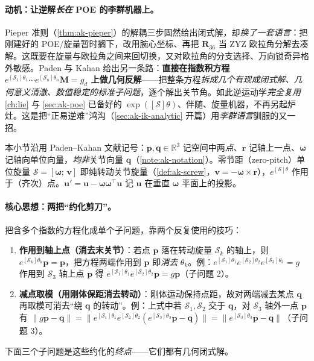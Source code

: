 \paragraph{动机：让逆解\emph{长在} POE 的李群机器上。}
Pieper 准则（\cref{thm:ak-pieper}）的解耦三步固然给出闭式解，却\emph{换了一套语言}：把刚建好的 POE/旋量暂时搁下，改用腕心坐标、再把 $\mathbf{R}_{36}$ 当 ZYZ 欧拉角分解去凑解。这既要在旋量与欧拉角之间来回切换，又对欧拉角的分支选择、万向锁奇异格外敏感。Paden 与 Kahan 给出另一条路\cite{paden1986thesis,murray1994mathematical}：\textbf{直接在指数积方程 $e^{[\mathcal{S}_1]\theta_1}\cdots e^{[\mathcal{S}_n]\theta_n}\mathbf{M}=g_d$ 上做几何反解}——把整条方程\emph{拆成几个有现成闭式解、几何意义清澈、数值稳定的标准子问题}，逐个解出关节角。如此逆运动学\emph{完全复用} \cref{ch:lie} 与 \cref{sec:ak-poe} 已备好的 $\exp([\mathcal{S}]\theta)$、伴随、旋量机器，不再另起炉灶。这是把“正易逆难”鸿沟（\cref{sec:ak-ik-analytic} 开篇）用\emph{李群语言}驯服的又一招。

\begin{note}[本小节局部记号]\label{note:ak-pk-notation}
本小节沿用 Paden--Kahan 文献记号：$\mathbf{p},\mathbf{q}\in\mathbb{R}^3$ 记空间中两\emph{点}、$\mathbf{r}$ 记轴上一点、$\boldsymbol{\omega}$ 记轴向单位向量，\emph{均非}关节向量 $\mathbf{q}$（\cref{note:ak-notation}）。零节距（zero-pitch）单位旋量 $\mathcal{S}=[\boldsymbol{\omega};\,\mathbf{v}]$ 即纯转动关节旋量（\cref{def:ak-screw}，$\mathbf{v}=-\boldsymbol{\omega}\times\mathbf{r}$），$e^{[\mathcal{S}]\theta}$ 作用于（齐次）点。$\mathbf{u}'=\mathbf{u}-\boldsymbol{\omega}\boldsymbol{\omega}^\top\mathbf{u}$ 记 $\mathbf{u}$ 在垂直 $\boldsymbol{\omega}$ 平面上的投影。
\end{note}

\paragraph{核心思想：两把“约化剪刀”。}
把含多个指数的方程化成单个子问题，靠两个反复使用的技巧\cite{murray1994mathematical}：
\begin{enumerate}
  \item \textbf{作用到轴上点（消去末关节）}：若点 $\mathbf{p}$ 落在转动旋量 $\mathcal{S}_k$ 的轴上，则 $e^{[\mathcal{S}_k]\theta_k}\mathbf{p}=\mathbf{p}$，把方程两端作用到 $\mathbf{p}$ 即\emph{消去} $\theta_k$。例：$e^{[\mathcal{S}_1]\theta_1}e^{[\mathcal{S}_2]\theta_2}e^{[\mathcal{S}_3]\theta_3}=g$ 作用到 $\mathcal{S}_3$ 轴上点 $\mathbf{p}$ 得 $e^{[\mathcal{S}_1]\theta_1}e^{[\mathcal{S}_2]\theta_2}\mathbf{p}=g\mathbf{p}$（子问题 2）。
  \item \textbf{减点取模（用刚体保距消去转动）}：刚体运动保持点距，故对两端减去某点 $\mathbf{q}$ 再取模可消去“绕 $\mathbf{q}$ 的转动”。例：上式中若 $\mathcal{S}_1,\mathcal{S}_2$ 交于 $\mathbf{q}$，对 $\mathcal{S}_3$ 轴外一点 $\mathbf{p}$ 有 $\|g\mathbf{p}-\mathbf{q}\|=\|e^{[\mathcal{S}_1]\theta_1}e^{[\mathcal{S}_2]\theta_2}(e^{[\mathcal{S}_3]\theta_3}\mathbf{p}-\mathbf{q})\|=\|e^{[\mathcal{S}_3]\theta_3}\mathbf{p}-\mathbf{q}\|$（子问题 3）。
\end{enumerate}
下面三个子问题是这些约化的\emph{终点}——它们都有几何闭式解。

